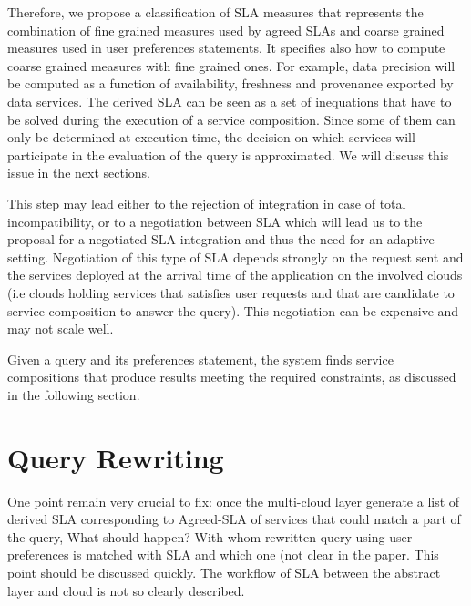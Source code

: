 Therefore, we propose a classification of SLA measures that represents the combination of fine grained measures used by agreed SLAs and coarse grained measures used in user preferences statements. 
It specifies also how to compute coarse grained measures with fine grained ones. 
For example, data precision will be computed as a function of availability, freshness and provenance exported by data services. The derived SLA can be seen as a set of inequations that have to be solved during the execution of a service composition. Since some of them can only be determined at execution time, the decision on which services will participate in the evaluation of the query is approximated. We will discuss this issue in the next sections.

This step may lead either to the rejection of integration in case of total incompatibility, or to a negotiation between SLA which will lead us to the proposal for a negotiated SLA integration and thus the need for an adaptive setting.
Negotiation of this type of SLA depends strongly on the request sent and the services deployed at the arrival time of the application on the involved  clouds (i.e clouds holding services that satisfies user requests and that are candidate to service composition to answer the query). This negotiation can be expensive and may not scale well.
 
Given a query and its preferences statement, the system  finds  service compositions that produce results   meeting the required constraints, as discussed in the following section.

 
 
\section{Query Rewriting}
\label{sec:queryRew}

\color{red}
One point remain very crucial to fix: once the multi-cloud layer generate a list of derived SLA corresponding to Agreed-SLA of services that could match a part of the query, What should happen?  With whom rewritten query using user preferences is matched with SLA and which one (not clear in the paper.  This point should be discussed quickly. The workflow of SLA between the abstract layer and cloud is not so clearly described.

